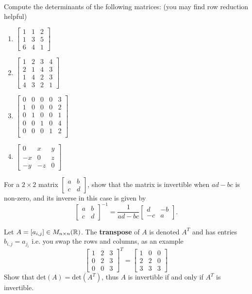 \begin{exerciselist}
	\item Compute the determinants of the following matrices: (you may find row reduction helpful) \begin{enumerate}
		\item $\begin{bmatrix}
			1&1&2\\1&3&5\\6&4&1
		\end{bmatrix}$
		\item $\begin{bmatrix}
			1&2&3&4\\2&1&4&3\\1&4&2&3\\4&3&2&1
		\end{bmatrix}$
		\item $\begin{bmatrix}
			0&0&0&0&3\\
			1&0&0&0&2\\
			0&1&0&0&1\\
			0&0&1&0&4\\
			0&0&0&1&2\\
		\end{bmatrix}$
		\item $\begin{bmatrix}
			0&x&y\\-x&0&z\\-y&-z&0
		\end{bmatrix}$
	\end{enumerate}
	\item For a $2\times 2$ matrix $\begin{bmatrix}
		a&b\\c&d
	\end{bmatrix}$, show that the matrix is invertible when $ad-bc$ is non-zero, and its inverse in this case is given by \[
	\begin{bmatrix}
		a&b\\c&d
	\end{bmatrix}^{-1}=
	\frac{1}{ad-bc}\begin{bmatrix}
		d & -b\\-c& a
	\end{bmatrix}.
	\]
	\item Let $A=[a_{i,j}]\in M_{n\times n}(\mathbb{R})$. The \textbf{transpose} of $A$ is denoted $A^T$ and has entries $b_{i,j}=a_{j_i}$ i.e. you swap the rows and columns, as an example \[
	\begin{bmatrix}
		1&2&3\\0&2&3\\0&0&3
	\end{bmatrix}^T=\begin{bmatrix}
		1&0&0\\2&2&0\\3&3&3
	\end{bmatrix}
	\]
	Show that det$(A)=$det$(A^T)$, thus $A$ is invertible if and only if $A^T$ is invertible.
\end{exerciselist}
